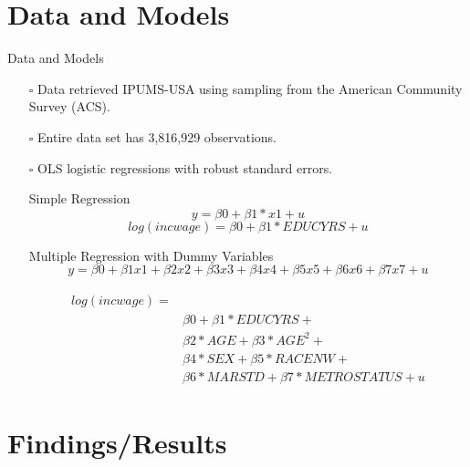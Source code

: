 \documentclass[9pt]{beamer}
\begin{document}
\section{Data and Models}
\begin{frame}{Data and Models}
\begin{itemize}
  \setlength\itemsep{1em}
\item[$\square$] Data retrieved IPUMS-USA using sampling from the American Community Survey (ACS). 
\item[$\square$] Entire data set has 3,816,929 observations.
\item[$\square$] OLS logistic regressions with robust standard errors.


\itemsep{$-$} Simple Regression 
\begin{equation}
y = \beta0 + \beta1*x1 + u
\end{equation}
\begin{equation}
    log(incwage) = \beta0 + \beta1*EDUCYRS + u 
\end{equation}

\itemsep{$-$} Multiple Regression with Dummy Variables 
    \begin{equation}
    y = \beta0 + \beta1x1+ \beta2x2+ \beta3x3 + \beta4x4 + \beta5x5 + \beta6x6 + \beta7x7 + u 
\end{equation}

\begin{equation}
\begin{aligned}
\begin{split}
log(incwage) = \\
&   \beta0 + \beta1*EDUCYRS + \\
&  \beta2*AGE+ \beta3*AGE^2 + \\
&  \beta4*SEX + \beta5*RACENW + \\
&  \beta6*MARSTD +\beta7*METROSTATUS + u
\end{split}
\end{aligned}
\end{equation}

\end{itemize} 
\end{frame}

\section{Findings/Results}
\end{document}
